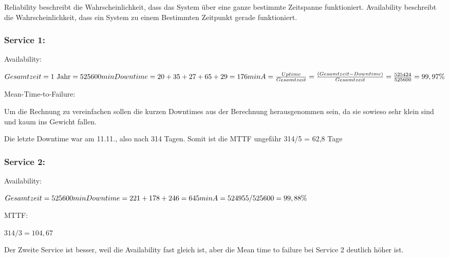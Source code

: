 \documentclass[a4paper,
			llpt,
			solution,
			accentcolor=tud2d,
			colorbacktitle
			]
			{tudexercise}
\begin{document}
Reliability beschreibt die Wahrscheinlichkeit, dass das System über eine ganze bestimmte Zeitspanne funktioniert. Availability beschreibt die Wahrscheinlichkeit, dass ein System zu einem Bestimmten Zeitpunkt gerade funktioniert.

\subsubsection*{Service 1:}

Availability:

\begin{math}
    Gesamtzeit = 1\ \textrm{Jahr} = 525 600 min \\
    Downtime = 20 + 35 + 27 + 65 + 29 = 176 min \\
    A = \frac{Uptime}{Gesamtzeit} = \frac{(Gesamtzeit - Downtime)}{Gesamtzeit} = \frac{525424}{525600} = 99,97 \%
\end{math}

Mean-Time-to-Failure:

Um die Rechnung zu vereinfachen sollen die kurzen Downtimes aus der Berechnung herausgenommen sein, da sie sowieso sehr klein sind und kaum ins Gewicht fallen.

Die letzte Downtime war am 11.11., also nach 314 Tagen. Somit ist die MTTF ungefähr 314/5 = 62,8 Tage

\subsubsection*{Service 2:}

Availability:

\begin{math}
    Gesamtzeit = 525 600 min \\
    Downtime = 221 + 178 + 246 = 645 min \\
    A = 524955/525600 = 99,88 \%
\end{math}

MTTF:

\begin{math}
314/3 = 104,67
\end{math}

Der Zweite Service ist besser, weil die Availability fast gleich ist, aber die Mean time to failure bei Service 2 deutlich höher ist.
\end{document}
